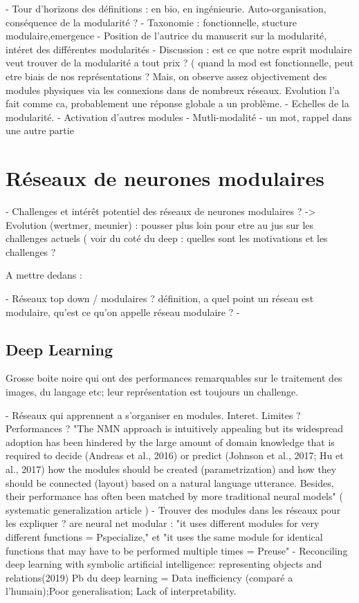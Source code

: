 - Tour d'horizons des définitions : en bio, en ingénieurie. Auto-organisation, conséquence de la modularité ? 
- Taxonomie : fonctionnelle, stucture modulaire,emergence 
- Position de l'autrice du manuscrit sur la modularité, intéret des différentes modularités
- Discussion : est ce que notre esprit modulaire veut trouver de la modularité a tout prix ? ( quand la mod est fonctionnelle, peut etre biais de nos représentations ? Mais, on observe assez objectivement des modules physiques via les connexions dans de nombreux réseaux. Evolution l'a fait comme ca, probablement une réponse globale a un problème. 
- Echelles de la modularité. 
- Activation d'autres modules
- Mutli-modalité - un mot, rappel dans une autre partie
\section{Réseaux de neurones modulaires}

- Challenges et intérêt potentiel des réseaux de neurones modulaires ? -> Evolution (wertmer, meunier) : pousser plus loin pour etre au jus sur les challenges actuels ( voir du coté du deep : quelles sont les motivations et les challenges ? 


A mettre dedans : 

- Réseaux top down / modulaires ? définition, a quel point un réseau est modulaire, qu'est ce qu'on appelle réseau modulaire ? 
- 

\subsection{Deep Learning}
Grosse boite noire qui ont des performances remarquables sur le traitement des images, du langage etc; leur représentation est toujours un challenge.

- Réseaux qui apprennent a s'organiser en modules. Interet. Limites ? Performances ? \cite{Andreas2016NeuralMN,Kirsch2018ModularNL}
"The NMN approach is intuitively appealing but its
widespread adoption has been hindered by the large amount of domain knowledge that is required
to decide (Andreas et al., 2016) or predict (Johnson et al., 2017; Hu et al., 2017) how the modules
should be created (parametrization) and how they should be connected (layout) based on a natural
language utterance. Besides, their performance has often been matched by more traditional neural
models" ( systematic generalization article ) 
- Trouver des modules dans les réseaux pour les expliquer ? \cite{Watanabe2018ModularRO,Csordas2021AreNN}
are neural net modular : "it uses different modules for very different functions = Pspecialize," et "it uses the same module for identical functions that
may have to be performed multiple times = Preuse"
- Reconciling deep learning with symbolic artificial intelligence: representing objects and relations(2019)
Pb du deep learning = Data inefficiency (comparé a l'humain);Poor generalisation; Lack of interpretability.

